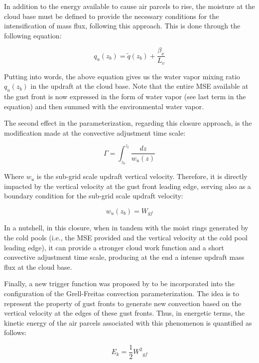 In addition to the energy available to cause air parcels to rise, the moisture at the cloud base must be defined to provide the necessary conditions for the intensification of mass flux, following this approach. This is done through the following equation:

\begin{equation}
	{q_u}(z_b) = \tilde q(z_b) + \frac{\beta_x}{L_v}
\end{equation}

Putting into words, the above equation gives us the water vapor mixing ratio $q_u(z_b)$ in the updraft at the cloud base. Note that the entire MSE available at the gust front is now expressed in the form of water vapor (see last term in the equation) and then summed with the environmental water vapor.

The second effect in the parameterization, regarding this closure approach, is the modification made at the convective adjustment time scale:

\begin{equation}
	\Gamma = \int_{z_b}^{z_t} \frac{dz}{w_u(z)}
\end{equation}

Where $w_u$ is the sub-grid scale updraft vertical velocity. Therefore, it is directly impacted by the vertical velocity at the gust front leading edge, serving also as a boundary condition for the sub-grid scale updraft velocity:

\begin{equation}
	{w_u(z_b)} = W_{gf}
\end{equation}

In a nutshell, in this closure, when in tandem with the moist rings generated by the cold pools (i.e., the MSE provided and the vertical velocity at the cold pool leading edge), it can provide a stronger cloud work function and a short convective adjustment time scale, producing at the end a intense updraft mass flux at the cloud base.

Finally, a new trigger function was proposed by  to be incorporated into the configuration of the Grell-Freitas convection parameterization. The idea is to represent the property of gust fronts to generate new convection based on the vertical velocity at the edges of these gust fronts. Thus, in energetic terms, the kinetic energy of the air parcels associated with this phenomenon is quantified as follows:

\begin{equation}
	{E_k} = \frac{1}{2}{W^2}_{gf}
\end{equation}

